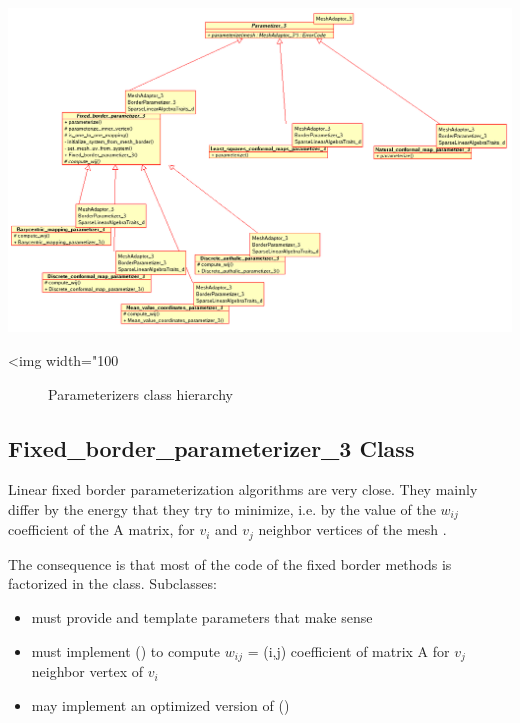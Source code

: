 \begin{center}
    \label{Surface_mesh_parameterization-fig-parameterizers_class_hierarchy}
    \begin{ccTexOnly}
        \includegraphics[width=1.1\textwidth]{Surface_mesh_parameterization/parameterizers_class_hierarchy}
    \end{ccTexOnly}
    \begin{ccHtmlOnly}
        <img width="100%
    \end{ccHtmlOnly}
    \begin{figure}[h]
        \caption{Parameterizers class hierarchy}
    \end{figure}
\end{center}


\subsection{Fixed\_border\_parameterizer\_3 Class}

Linear fixed border parameterization algorithms are very close. They mainly
differ by the energy that they try to minimize, i.e. by the value of the $w_{ij}$
coefficient of the A matrix, for $v_i$ and $v_j$ neighbor vertices of the mesh
\cite{cgal:fh-survey-05}.

The consequence is that most of the code of the fixed border methods is factorized in the
 class.
Subclasses:
\begin{itemize}
\item must provide  and  
      template parameters that make sense
\item must implement () to compute $w_{ij}$ = (i,j) coefficient 
      of matrix A for $v_j$ neighbor vertex of $v_i$
\item may implement an optimized version of ()
\end{itemize}

